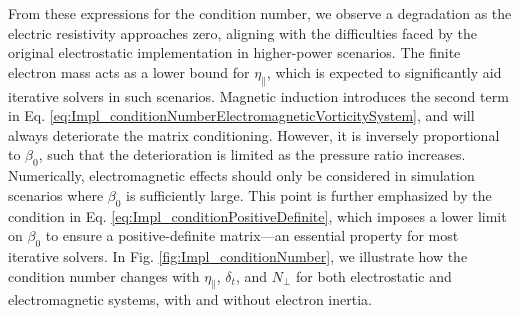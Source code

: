 From these expressions for the condition number, we observe a degradation as the electric resistivity approaches zero, aligning with the difficulties faced by the original electrostatic implementation in higher-power scenarios. The finite electron mass acts as a lower bound for $\eta_\parallel$, which is expected to significantly aid iterative solvers in such scenarios. Magnetic induction introduces the second term in Eq. \ref{eq:Impl_conditionNumberElectromagneticVorticitySystem}, and will always deteriorate the matrix conditioning. However, it is inversely proportional to $\beta_0$, such that the deterioration is limited as the pressure ratio increases. Numerically, electromagnetic effects should only be considered in simulation scenarios where $\beta_0$ is sufficiently large. This point is further emphasized by the condition in Eq. \ref{eq:Impl_conditionPositiveDefinite}, which imposes a lower limit on $\beta_0$ to ensure a positive-definite matrix—an essential property for most iterative solvers. In Fig. \ref{fig:Impl_conditionNumber}, we illustrate how the condition number changes with $\eta_\parallel$, $\delta_t$, and $N_\perp$ for both electrostatic and electromagnetic systems, with and without electron inertia. 

